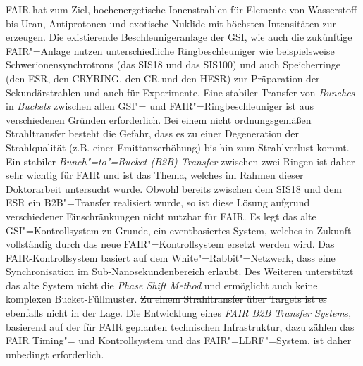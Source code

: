 FAIR hat zum Ziel, hochenergetische Ionenstrahlen für Elemente von Wasserstoff bis Uran, Antiprotonen und exotische Nuklide mit h\"ochsten  Intensit\"aten zur erzeugen. Die existierende Beschleunigeranlage der GSI, wie auch die zukünftige FAIR"=Anlage nutzen unterschiedliche Ringbeschleuniger wie beispielsweise Schwerionensynchrotrons (das SIS18 und das SIS100) und auch Speicherringe (den ESR, den CRYRING, den CR und den HESR) zur Pr\"aparation der Sekund\"arstrahlen und auch f\"ur Experimente.  Eine stabiler Transfer von \textit{Bunches} in \textit{Buckets} zwischen allen GSI"= und FAIR"=Ringbeschleuniger ist aus verschiedenen Gr\"unden erforderlich. Bei einem nicht ordnungsgem\"a\ss{}en Strahltransfer besteht die Gefahr, dass es zu einer Degeneration der Strahlqualit\"at (z.B.  einer Emittanzerh\"ohung) bis hin zum Strahlverlust kommt. Ein stabiler \textit{Bunch"=to"=Bucket (B2B) Transfer} zwischen zwei Ringen ist daher sehr wichtig f\"ur FAIR und ist das Thema, welches im Rahmen dieser Doktorarbeit untersucht wurde. Obwohl bereits zwischen dem SIS18 und dem ESR ein B2B"=Transfer realisiert wurde, so ist diese L\"osung aufgrund verschiedener Einschr\"ankungen nicht nutzbar f\"ur FAIR. Es legt das alte GSI"=Kontrollsystem  zu Grunde, ein eventbasiertes System, welches in Zukunft vollst\"andig durch das neue FAIR"=Kontrollsystem ersetzt werden wird. Das FAIR-Kontrollsystem basiert auf dem White"=Rabbit"=Netzwerk, dass eine Synchronisation im Sub-Nanosekundenbereich erlaubt. Des Weiteren unterst\"utzt das alte System nicht die \textit{Phase Shift Method} und erm\"oglicht auch keine komplexen Bucket-F\"ullmuster. \sout{Zu einem Strahltransfer \"uber Targets ist es ebenfalls nicht in der Lage.} Die Entwicklung eines \textit{FAIR B2B Transfer System}s, basierend auf der f\"ur FAIR geplanten technischen Infrastruktur, dazu z\"ahlen das FAIR Timing"= und Kontrollsystem und das FAIR"=LLRF"=System, ist daher unbedingt erforderlich.


